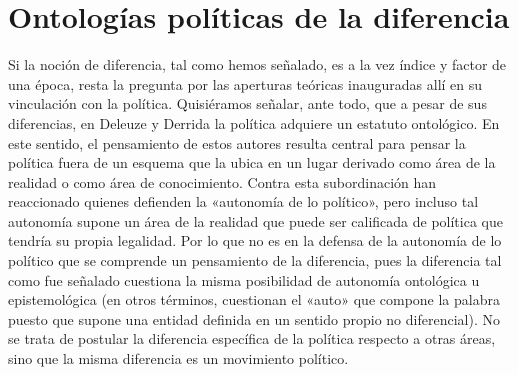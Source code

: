 \section{Ontologías políticas de la diferencia}


Si la noción de diferencia, tal como hemos señalado, es a la vez índice y factor de una época, resta la pregunta por las aperturas teóricas inauguradas allí en su vinculación con la política. Quisiéramos señalar, ante todo, que a pesar de sus diferencias, en Deleuze y Derrida la política adquiere un estatuto ontológico. En este sentido, el pensamiento de estos autores resulta central para pensar la política fuera de un esquema que la ubica en un lugar derivado como área de la realidad o como área de conocimiento. Contra esta subordinación han reaccionado quienes defienden la «autonomía de lo político», pero incluso tal autonomía supone un área de la realidad que puede ser calificada de política que tendría su propia legalidad. Por lo que no es en la defensa de la autonomía de lo político que se comprende un pensamiento de la diferencia, pues la diferencia tal como fue señalado cuestiona la misma posibilidad de autonomía ontológica u epistemológica (en otros términos, cuestionan el «auto» que compone la palabra puesto que supone una entidad definida en un sentido propio no diferencial). No se trata de postular la diferencia específica de la política respecto a otras áreas, sino que la misma diferencia es un movimiento político.

